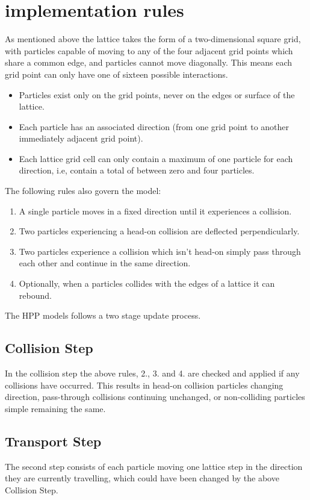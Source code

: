 \documentclass[paper=a4, fontsize=11pt]{scrartcl} %
\numberwithin{equation}{section} %
\numberwithin{figure}{section} %
\numberwithin{table}{section} %
\begin{document}
\section{implementation rules}
As mentioned above the lattice takes the form of a two-dimensional square grid, with particles capable of moving to any of the four adjacent grid points which share a common edge, and particles cannot move diagonally. This means each grid point can only have one of sixteen possible interactions.
\begin{itemize}
	\item Particles exist only on the grid points, never on the edges or surface of the lattice.
	\item Each particle has an associated direction (from one grid point to another immediately adjacent grid point).
	\item Each lattice grid cell can only contain a maximum of one particle for each direction, i.e, contain a total of between zero and four particles.
\end{itemize}
The following rules also govern the model:
\begin{enumerate}
	\item A single particle moves in a fixed direction until it experiences a collision.
	\item Two particles experiencing a head-on collision are deflected perpendicularly.
	\item Two particles experience a collision which isn't head-on simply pass through each other and continue in the same direction.
	\item Optionally, when a particles collides with the edges of a lattice it can rebound.
\end{enumerate}
The HPP models follows a two stage update process. \cite{wiki-hpp}

\subsection{Collision Step}
In the collision step the above rules, 2., 3. and 4. are checked and applied if any collisions have occurred. This results in head-on collision particles changing direction, pass-through collisions continuing unchanged, or non-colliding particles simple remaining the same. \cite{wiki-hpp}

\subsection{Transport Step}
The second step consists of each particle moving one lattice step in the direction they are currently travelling, which could have been changed by the above Collision Step. \cite{wiki-hpp}
\end{document}
